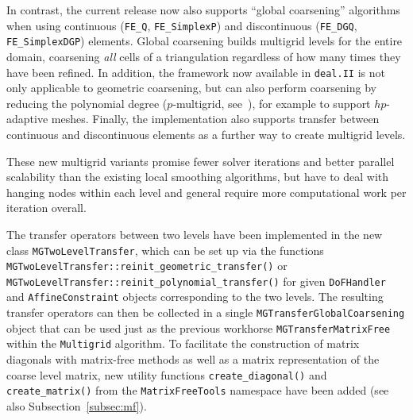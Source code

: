 \documentclass{ansarticle-preprint}
\newcommand{\specialword}[1]{\texttt{#1}}
\newcommand{\dealii}{{\specialword{deal.II}}\xspace}
\begin{document}
In contrast, the current release now also supports ``global
coarsening'' algorithms \citep{becker2000multigrid, sundar2012parallel} when
using continuous (\texttt{FE\_Q}, \texttt{FE\_SimplexP}) and
discontinuous (\texttt{FE\_DGQ}, \texttt{FE\_SimplexDGP})
elements. Global coarsening builds multigrid levels for the entire
domain, coarsening \textit{all} cells of a triangulation regardless of
how many times they have been refined. In addition, the framework now available in
\dealii{} is not only applicable to geometric coarsening, but can also
perform coarsening by reducing the polynomial degree ($p$-multigrid,
see~\cite{Fehn2020}), for example
to support $hp$-adaptive meshes.
Finally, the implementation also supports transfer between continuous
and discontinuous elements as a further way to create multigrid levels.

These new multigrid variants promise fewer solver
iterations and better parallel scalability than the existing local
smoothing algorithms, but have to deal with
hanging nodes within each level and general require more computational
work per iteration overall.

The transfer operators between two levels have been implemented in the new class \texttt{MGTwoLevel\allowbreak Transfer}, which can be set up via the functions \texttt{MGTwoLevel\allowbreak Transfer::\allowbreak reinit\_\allowbreak geometric\_\allowbreak transfer()} or \texttt{MGTwo\allowbreak LevelTransfer::\allowbreak reinit\_\allowbreak polynomial\_\allowbreak transfer()} for given
\texttt{DoFHandler} and \texttt{AffineConstraint} objects
corresponding to the two levels. The resulting transfer operators
can then be collected in a single
\texttt{MGTransfer\allowbreak GlobalCoarsening} object that can be used just as the previous workhorse \texttt{MGTransferMatrixFree} within the \texttt{Multigrid}
algorithm.
To facilitate the construction of matrix diagonals with matrix-free methods as well as a matrix representation of the coarse level matrix, new utility functions \texttt{create\_diagonal()} and \texttt{create\_matrix()} from
the \texttt{MatrixFreeTools} namespace have been added (see also Subsection~\ref{subsec:mf}).
\end{document}
